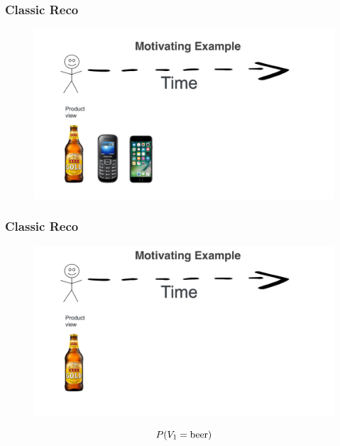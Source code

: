 \begin{frame}
  \frametitle{Classic Reco}
 
 
   \begin{figure}[h!]
     \includegraphics[scale=0.25]{images/mot_ex1cc.png}
       \centering
       \label{motex1}
   \end{figure}
     
 \end{frame}




 \begin{frame}
  \frametitle{Classic Reco}
 
 
   \begin{figure}[h!]
     \includegraphics[scale=0.25]{images/mot_ex1a.png}
       \centering
       \label{motex1}
   \end{figure}

   \[
   P(V_1 = {\rm beer})  
   \]
 \end{frame}


